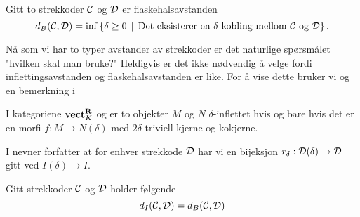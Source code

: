\begin{definisjon}\label{def:FlaskAvst}
Gitt to strekkoder $\mathcal{C}$ og $\mathcal{D}$ er flaskehalsavstanden
\[d_B(\mathcal{C},\mathcal{D}) = \inf\left\{\delta\geq 0\,\mid\,\text{Det eksisterer en $\delta$-kobling mellom $\mathcal{C}$ og $\mathcal{D}$}\right\}.\]
\end{definisjon}

Nå som vi har to typer avstander av strekkoder er det
naturlige spørsmålet "hvilken skal man bruke?" Heldigvis
er det ikke nødvendig å velge fordi inflettingsavstanden
og flaskehalsavstanden er like. For å vise dette bruker vi
\citep[proposisjon 4.2]{Bauer2020} og en bemerkning
i \citep[seksjon 4.2]{Bauer2020}

\begin{proposisjon}\label{prop:Prop2.4-Bauer2020}
  I kategoriene $\textnormal{\textbf{vect}}_K^{\textnormal{\textbf{{R}}}}$ og \Barc er to objekter $M$ og $N$
  $\delta$-inflettet hvis og bare hvis det er en morfi $f: M\to
  N(\delta)$ med $2\delta$-triviell kjerne og kokjerne.
\end{proposisjon}

\begin{bemerk}\label{bem:r_delta}
  I \citep[seksjon 4.2]{Bauer2020} nevner forfatter at for
  enhver strekkode $\mathcal{D}$ har vi en bijeksjon 
  $r_\delta:\mathcal{D}(\delta)\to\mathcal{D}$ gitt ved $I(\delta)\to
  I$.
\end{bemerk}

\begin{teorem}\label{trm:FA_lik_IA}
Gitt strekkoder $\mathcal{C}$ og $\mathcal{D}$ holder følgende
\[d_I(\mathcal{C},\mathcal{D}) = d_B(\mathcal{C},\mathcal{D})\]
\end{teorem}
